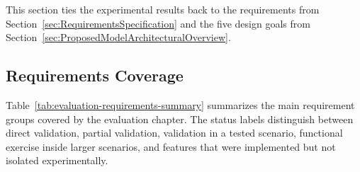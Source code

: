 This section ties the experimental results back to the requirements from Section~\ref{sec:RequirementsSpecification} and the five design goals from Section~\ref{sec:ProposedModelArchitecturalOverview}.

\subsection{Requirements Coverage}
\label{subsec:EvalReqCoverage}

Table~\ref{tab:evaluation-requirements-summary} summarizes the main requirement groups covered by the evaluation chapter. The status labels distinguish between direct validation, partial validation, validation in a tested scenario, functional exercise inside larger scenarios, and features that were implemented but not isolated experimentally.

